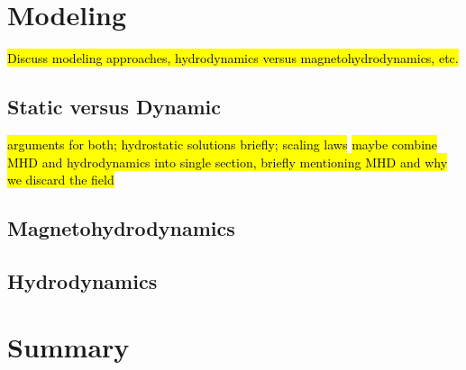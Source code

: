 \section{Modeling}
\label{sec:modeling}
\hl{Discuss modeling approaches, hydrodynamics versus magnetohydrodynamics, etc.}
\subsection{Static versus Dynamic}
\hl{arguments for both; hydrostatic solutions briefly; scaling laws}
\hl{maybe combine MHD and hydrodynamics into single section, briefly mentioning MHD and why we discard the field}
\subsection{Magnetohydrodynamics}
\subsection{Hydrodynamics}
\section{Summary}
